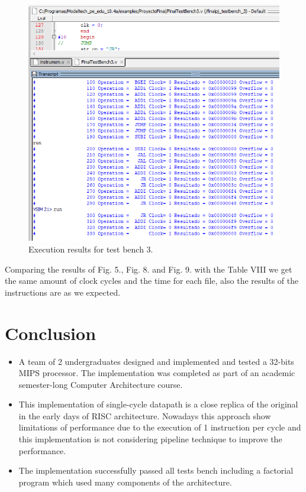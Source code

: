 \documentclass[conference]{IEEEtran}
\begin{document}
\begin{figure}[h]
\includegraphics[scale=0.5]{ModelSim_testbench3_clock_cycles.png}
\caption{Execution results for test bench 3.}
\label{result3}
\end{figure}

Comparing the results of Fig. 5., Fig. 8. and Fig. 9. with the Table VIII we get the same amount
of clock cycles and the time for each file, also the results of the instructions are as we expected.
 
\section{Conclusion}
\begin{itemize}
\item A team of 2 undergraduates designed and implemented and tested a 32-bits MIPS processor. The implementation was completed as part of an academic semester-long Computer Architecture course.
\item This implementation of single-cycle datapath is a close replica of the original in the early days of RISC architecture. Nowadays this approach show limitations of performance due to the execution of 1 instruction per cycle and this implementation is not considering pipeline technique to improve the performance.
\item The implementation successfully passed all tests bench including a factorial program which used many components of the architecture.
\end{itemize}
\end{document}
